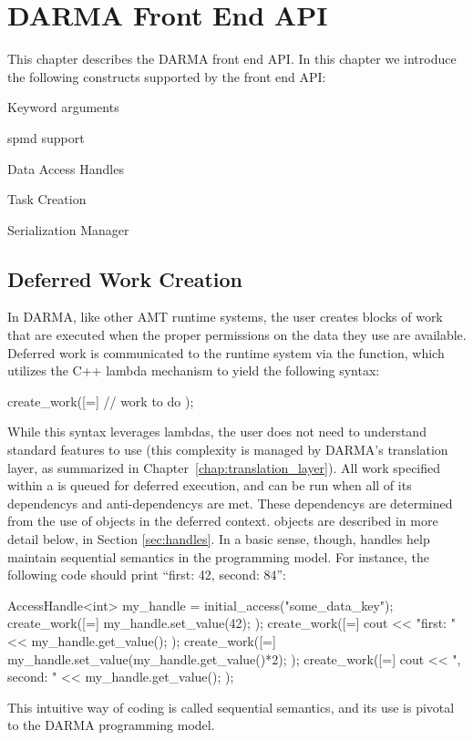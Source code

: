 
\chapter{DARMA Front End API}
\label{chap:front_end}
This chapter describes the DARMA \gls{front end} \gls{API}. In this chapter we
introduce the following constructs supported by the \gls{front end} \gls{API}:
\begin{compactitem}
\item Keyword arguments
\item \gls{spmd} support
\item Data Access Handles
\item Task Creation
\item Serialization Manager
\end{compactitem}

\section{Deferred Work Creation}
\label{sec:deferred}
In DARMA, like other AMT runtime systems, the user creates blocks of work that
are executed when the proper permissions on the data they use are available. 
Deferred work is communicated to the runtime system via the
 function, which utilizes the C++ lambda mechanism to
yield the following syntax:
\begin{CppCode}
  create_work([=]{
    // work to do
  });
\end{CppCode}

While this syntax leverages  lambdas, the user does not need to understand
 standard features to use  (this
complexity is managed by DARMA's translation layer, as summarized in
Chapter~\ref{chap:translation_layer}).  All work specified within a
 is queued for deferred execution, and can be run when
all of its \glspl{dependency} and \glspl{anti-dependency} are met.  
These \glspl{dependency} are determined from the use of 
 objects in the deferred context. 
 objects are described in more detail below, in
Section \ref{sec:handles}.  In a basic sense, though, handles help maintain
\gls{sequential semantics} in the programming model.  For instance, the
following code should print ``first: 42, second: 84'':
\begin{CppCode}
AccessHandle<int> my_handle = initial_access("some_data_key");
create_work([=]{
  my_handle.set_value(42);
});
create_work([=]{
  cout << "first: " << my_handle.get_value();
});
create_work([=]{
  my_handle.set_value(my_handle.get_value()*2);
});
create_work([=]{
  cout << ", second: " << my_handle.get_value();
});
\end{CppCode}
This intuitive way of coding is called \gls{sequential semantics}, and its use
is pivotal to the DARMA programming model.

